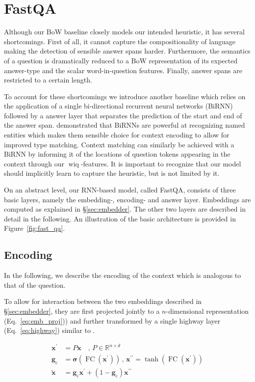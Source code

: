 \documentclass[11pt,a4paper]{article}
\begin{document}
\section{FastQA}

Although our BoW baseline closely models our intended heuristic, it has several shortcomings. First of all, it cannot capture the compositionality of language making the detection of sensible answer spans harder. Furthermore, the semantics of a question is dramatically reduced to a BoW representation of its expected answer-type and the scalar word-in-question features. Finally, answer spans are restricted to a certain length.

To account for these shortcomings we introduce another baseline which relies on the application of a single bi-directional recurrent neural networks (BiRNN) followed by a answer layer that separates the prediction of the start and end of the answer span.  demonstrated that BiRNNs are powerful at recognizing named entities which makes them sensible choice for context encoding to allow for improved type matching. Context matching can similarly be achieved with a BiRNN by informing it of the locations of question tokens appearing in the context through our $\operatorname{wiq}$-features. It is important to recognize that our model should implicitly learn to capture the heuristic, but is not limited by it.

On an abstract level, our RNN-based model, called FastQA, consists of three basic layers, namely the embedding-, encoding- and answer layer. Embeddings are computed as explained in \S\ref{sec:embedder}. The other two layers are described in detail in the following. An illustration of the basic architecture is provided in Figure~\ref{fig:fast_qa}.

\subsection{Encoding}

In the following, we describe the encoding of the context which is analogous to that of the question. 

To allow for interaction between the two embeddings described in \S\ref{sec:embedder}, they are first projected jointly to a $n$-dimensional representation (Eq.~\ref{eq:emb_proj})) and further transformed by a single highway layer (Eq.~\ref{eq:highway}) similar to .

\begin{align}
    \boldsymbol{x}^\prime &= P \boldsymbol{x} \quad ,\, P \in \mathbb{R}^{n \times d}  \label{eq:emb_proj} \\ 
    \boldsymbol{g}_e &= \boldsymbol{\sigma}(\operatorname{FC}(\boldsymbol{x}^\prime))\, , \,
    \boldsymbol{x}^{\prime\prime} = \tanh\left(\operatorname{FC}\left(\boldsymbol{x}^\prime\right)\right) \nonumber \\
    \tilde{\boldsymbol{x}} &= \boldsymbol{g}_e \boldsymbol{x}^\prime + (1-\boldsymbol{g}_e) \boldsymbol{x}^{\prime\prime} \label{eq:highway}    
\end{align}
\end{document}
